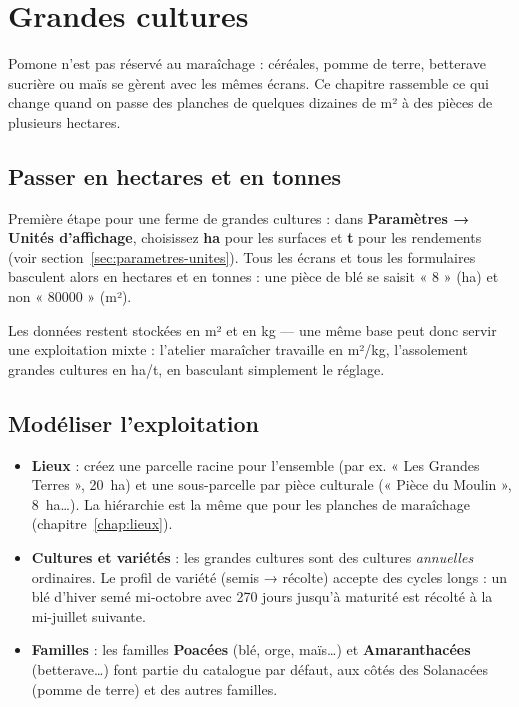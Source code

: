 \chapter{Grandes cultures}
\label{chap:grandes-cultures}

Pomone n'est pas réservé au maraîchage : céréales, pomme de terre, betterave sucrière ou maïs se gèrent avec les mêmes écrans. Ce chapitre rassemble ce qui change quand on passe des planches de quelques dizaines de m² à des pièces de plusieurs hectares.

\section{Passer en hectares et en tonnes}

Première étape pour une ferme de grandes cultures : dans \textbf{Paramètres → Unités d'affichage}, choisissez \textbf{ha} pour les surfaces et \textbf{t} pour les rendements (voir section~\ref{sec:parametres-unites}). Tous les écrans et tous les formulaires basculent alors en hectares et en tonnes : une pièce de blé se saisit « 8 » (ha) et non « 80000 » (m²).

Les données restent stockées en m² et en kg — une même base peut donc servir une exploitation mixte : l'atelier maraîcher travaille en m²/kg, l'assolement grandes cultures en ha/t, en basculant simplement le réglage.

\section{Modéliser l'exploitation}

\begin{itemize}
  \item \textbf{Lieux} : créez une parcelle racine pour l'ensemble (par ex. « Les Grandes Terres », 20~ha) et une sous-parcelle par pièce culturale (« Pièce du Moulin », 8~ha…). La hiérarchie est la même que pour les planches de maraîchage (chapitre~\ref{chap:lieux}).
  \item \textbf{Cultures et variétés} : les grandes cultures sont des cultures \emph{annuelles} ordinaires. Le profil de variété (semis → récolte) accepte des cycles longs : un blé d'hiver semé mi-octobre avec 270 jours jusqu'à maturité est récolté à la mi-juillet suivante.
  \item \textbf{Familles} : les familles \textbf{Poacées} (blé, orge, maïs…) et \textbf{Amaranthacées} (betterave…) font partie du catalogue par défaut, aux côtés des Solanacées (pomme de terre) et des autres familles.
\end{itemize}

